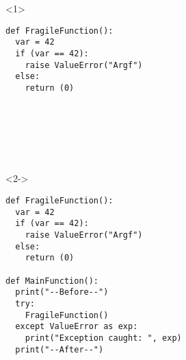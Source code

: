 
\begin{frame}[fragile]{}


  \begin{columns}[onlytextwidth]
    \begin{column}{\textwidth}

      \begin{onlyenv}<1>
        \begin{lstlisting}[style=python,morekeywords={as},basicstyle=\ttfamily\footnotesize]
def FragileFunction():
  var = 42
  if (var == 42):
    raise ValueError("Argf")
  else:
    return (0)







 \end{lstlisting}
      \end{onlyenv}

      \begin{onlyenv}<2->
        \begin{lstlisting}[style=python,morekeywords={as},basicstyle=\ttfamily\footnotesize]
def FragileFunction():
  var = 42
  if (var == 42):
    raise ValueError("Argf")
  else:
    return (0)

def MainFunction():
  print("--Before--")
  try:
    FragileFunction()
  except ValueError as exp:
    print("Exception caught: ", exp)
  print("--After--") \end{lstlisting}
      \end{onlyenv}

    \end{column}
  \end{columns}

\end{frame}




